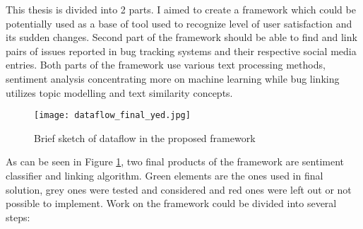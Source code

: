 This thesis is divided into 2 parts. I aimed to create a framework which could be potentially used as a base of tool used to recognize level of user satisfaction and its sudden changes. Second part of the framework should be able to find and link pairs of issues reported in bug tracking systems and their respective social media entries. Both parts of the framework use various text processing methods, sentiment analysis concentrating more on machine learning while bug linking utilizes topic modelling and text similarity concepts.\\
\begin{figure}%
    \centering
	\texttt{[image: dataflow\_final\_yed.jpg]}
    \caption{Brief sketch of dataflow in the proposed framework}%
    \label{fig:frameworkDataflow}%
\end{figure}
As can be seen in Figure \ref{fig:frameworkDataflow}, two final products of the framework are sentiment classifier and linking algorithm. Green elements are the ones used in final solution, grey ones were tested and considered and red ones were left out or not possible to implement. Work on the framework could be divided into several steps:
